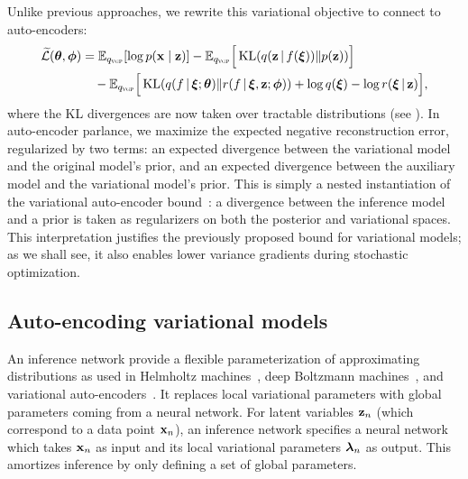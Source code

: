 Unlike previous approaches, we rewrite this variational objective to
connect to auto-encoders:
\begin{align}
\label{eq:variational_objective}
\begin{split}
\widetilde{\mathcal{L}}(\boldsymbol{\mathbf{\theta}},\boldsymbol{\mathbf{\phi}})
&
=
\mathbb{E}_{q_{\textsc{vgp}}}[\log p(\boldsymbol{\mathbf{x}}\mid\boldsymbol{\mathbf{z}})]
-
\mathbb{E}_{q_{\textsc{vgp}}}\Big[
\operatorname{KL}(q(\boldsymbol{\mathbf{z}}\,|\, f(\boldsymbol{\mathbf{\xi}}))\|p(\boldsymbol{\mathbf{z}}))
\Big]
\\
&
\quad
-
\mathbb{E}_{q_{\textsc{vgp}}}\Big[
\operatorname{KL}(q(f\,|\,\boldsymbol{\mathbf{\xi}};\boldsymbol{\mathbf{\theta}})\|r(f\,|\,\boldsymbol{\mathbf{\xi}},\boldsymbol{\mathbf{z}};\boldsymbol{\mathbf{\phi}}))
+
\log q(\boldsymbol{\mathbf{\xi}}) - \log r(\boldsymbol{\mathbf{\xi}}\,|\,\boldsymbol{\mathbf{z}})
\Big],
\end{split}
\end{align}
where the KL divergences are now taken over tractable distributions
(see ).
In auto-encoder parlance, we maximize the expected negative
reconstruction error, regularized by two terms: an expected divergence between
the variational model and the original model's prior, and an expected
divergence between the auxiliary model and the variational model's
prior. This is simply a nested instantiation of the variational
auto-encoder bound~\citep{kingma2014autoencoding}: a
divergence between the inference model and a prior is taken as
regularizers on both the posterior and variational spaces. This
interpretation justifies the previously proposed
bound for variational models;
as we shall see, it also enables lower variance gradients during
stochastic optimization.

\subsection{Auto-encoding variational models}

An inference network provide a flexible parameterization of
approximating distributions as used in Helmholtz
machines~\citep{hinton1994autoencoders}, deep Boltzmann machines~\citep{salakhutdinov2010efficient}, and variational
auto-encoders~\citep{kingma2014autoencoding,rezende2014stochastic}.
It replaces local variational parameters with global parameters
coming from a neural network. For latent variables $\boldsymbol{\mathbf{z}}_n$
(which correspond to a data point $\boldsymbol{\mathbf{x}}_n$), an inference network
specifies a neural network which takes $\boldsymbol{\mathbf{x}}_n$ as input and its local
variational parameters $\boldsymbol{\mathbf{\lambda}}_n$ as output.  This amortizes
inference by only defining a set of global parameters.



